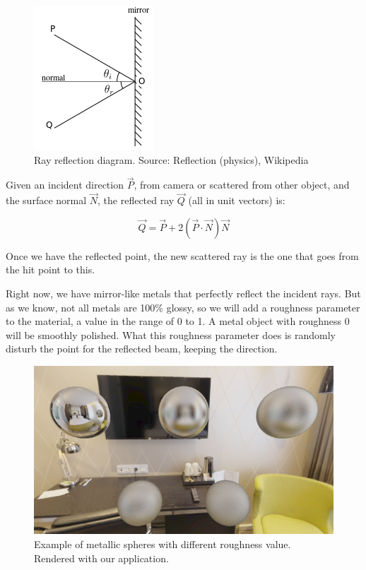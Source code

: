 \documentclass[titlepage,12pt]{report}
\begin{document}
\begin{figure}[H]
	\centering
	\includegraphics[scale=0.65]{media/Reflection_angles.png}
	\caption{Ray reflection diagram. Source: Reflection (physics), Wikipedia }
	\label{metal1}
\end{figure}

Given an incident direction $\vec{P}$, from camera or scattered from other object, and the surface normal $\vec{N}$, the reflected ray $\vec{Q}$ (all in unit vectors) is:

\begin{equation}
	\vec{Q} = \vec{P} + 2(\vec{P}\cdot\vec{N})\vec{N}
\end{equation}

Once we have the reflected point, the new scattered ray is the one that goes from the hit point to this.

Right now, we have mirror-like metals that perfectly reflect the incident rays. But as we know, not all metals are 100\% glossy, so we will add a roughness parameter to the material, a value in the range of 0 to 1. A metal object with roughness 0 will be smoothly polished. What this roughness parameter does is randomly disturb the point for the reflected beam, keeping the direction.

\begin{figure}[H]
	\centering
	\includegraphics[scale=0.65]{media/example_metals.png}
	\caption{Example of metallic spheres with different roughness value. Rendered with our application.}
	\label{metal2}
\end{figure}
\end{document}
